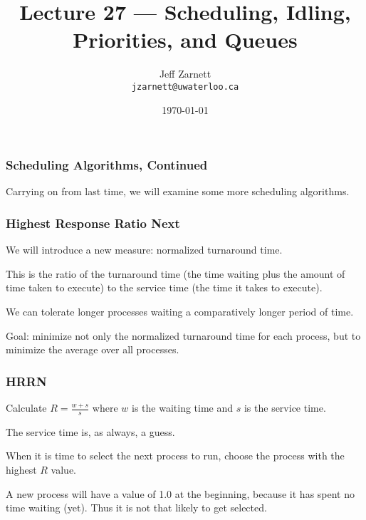 

\title{Lecture 27 --- Scheduling, Idling, Priorities, and Queues }

\author{Jeff Zarnett \\ \small \texttt{jzarnett@uwaterloo.ca}}
\date{\today}




\begin{frame}
  \titlepage

 \end{frame}



\begin{frame}
\frametitle{Scheduling Algorithms, Continued}

Carrying on from last time, we will examine some more scheduling algorithms.

\end{frame}

\begin{frame}
\frametitle{Highest Response Ratio Next}

We will introduce a new measure: \alert{normalized turnaround time}. 

This is the ratio of the turnaround time (the time waiting plus the amount of time taken to execute) to the service time (the time it takes to execute). 

We can tolerate longer processes waiting a comparatively longer period of time. 

Goal: minimize not only the normalized turnaround time for each process, but to minimize the average over all processes.


\end{frame}

\begin{frame}
\frametitle{HRRN}

Calculate $R = \frac{w + s}{s}$ 
where $w$ is the waiting time and $s$ is the service time. 

The service time is, as always, a guess. 

When it is time to select the next process to run, choose the process with the highest $R$ value. 

A new process will have a value of 1.0 at the beginning, because it has spent no time waiting (yet). Thus it is not that likely to get selected.


\end{frame}

